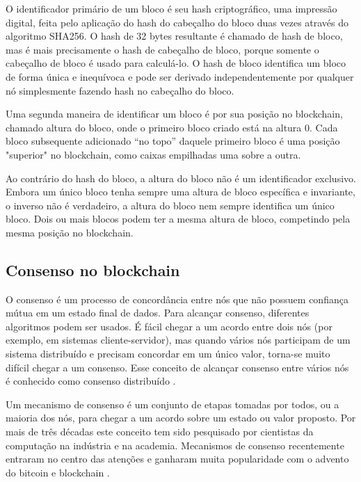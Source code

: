     O identificador primário de um bloco é seu hash criptográfico, uma impressão digital, feita pelo aplicação do hash do cabeçalho do bloco duas vezes através do algoritmo SHA256. O hash de 32 bytes resultante é chamado de hash de bloco, mas é mais precisamente o hash de cabeçalho de bloco, porque somente o cabeçalho de bloco é usado para calculá-lo. O hash de bloco identifica um bloco de forma única e inequívoca e pode ser derivado independentemente por qualquer nó simplesmente fazendo hash no cabeçalho do bloco.\cite{mastering_blockchain_andreas}
    
    Uma segunda maneira de identificar um bloco é por sua posição no blockchain, chamado altura do bloco, onde o primeiro bloco criado está na altura 0. Cada bloco subsequente adicionado “no topo” daquele primeiro bloco é uma posição "superior" no blockchain, como caixas empilhadas uma sobre a outra.\cite{mastering_blockchain_andreas}

    Ao contrário do hash do bloco, a altura do bloco não é um identificador exclusivo. Embora um único bloco tenha sempre uma altura de bloco específica e invariante, o inverso não é verdadeiro, a altura do bloco nem sempre identifica um único bloco. Dois ou mais blocos podem ter a mesma altura de bloco, competindo pela mesma posição no blockchain.
    
    
    
    \subsection{Consenso no blockchain}

        O consenso é um processo de concordância entre nós que não possuem confiança mútua em um estado final de dados. Para alcançar consenso, diferentes algoritmos podem ser usados. É fácil chegar a um acordo entre dois nós (por exemplo, em sistemas cliente-servidor), mas quando vários nós participam de um sistema distribuído e precisam concordar em um único valor, torna-se muito difícil chegar a um consenso. Esse conceito de alcançar consenso entre vários nós é conhecido como consenso distribuído \cite{mastering_blockchain}.
        
        Um mecanismo de consenso é um conjunto de etapas tomadas por todos, ou a maioria dos nós, para chegar a um acordo sobre um estado ou valor proposto. Por mais de três décadas este conceito tem sido pesquisado por cientistas da computação na indústria e na academia. Mecanismos de consenso recentemente entraram no centro das atenções e ganharam muita popularidade com o advento do bitcoin e blockchain \cite{mastering_blockchain}.
        
